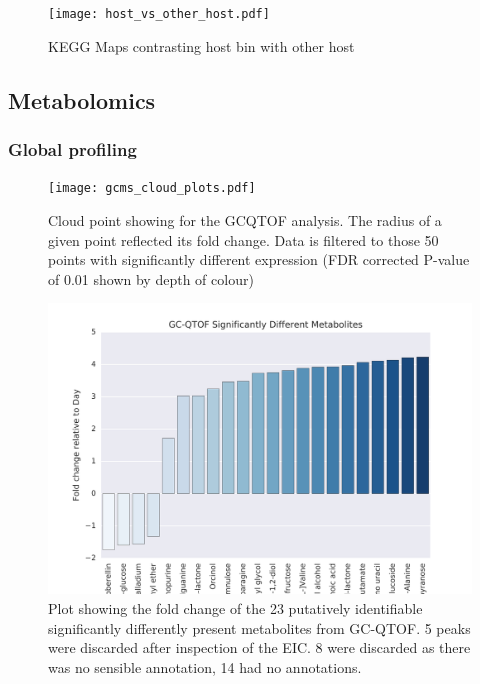 \begin{figure}
    \texttt{[image: host\_vs\_other\_host.pdf]}
    \caption[KEGG Maps of Host Bin Compared with Other \textit{Paramecium}]{
    KEGG Maps contrasting host bin with other host}
\end{figure}

\subsection{Metabolomics} 

\subsubsection{Global profiling}



\begin{figure}
    \texttt{[image: gcms\_cloud\_plots.pdf]}
    \caption[GCQTOF Cloud Plot]{Cloud point showing for the GCQTOF analysis. 
    The radius of a given point reflected its fold change.
    Data is filtered to those 50 points with significantly 
different expression (FDR corrected P-value of 0.01 shown by 
depth of colour)}
    \label{fig:gcms_clouds}
\end{figure}


\begin{figure}
    \includegraphics{GCMS_metabolites.svg}
    \caption[Plot of Identifiable GC-QTOF Metabolites]{Plot showing the
        fold change of the 23 putatively identifiable significantly
        differently present metabolites from GC-QTOF. 5 peaks
        were discarded after inspection of the EIC. 8 were discarded
    as there was no sensible annotation, 14 had no annotations.}
    \label{fig:gcms_metabolites}
\end{figure}



